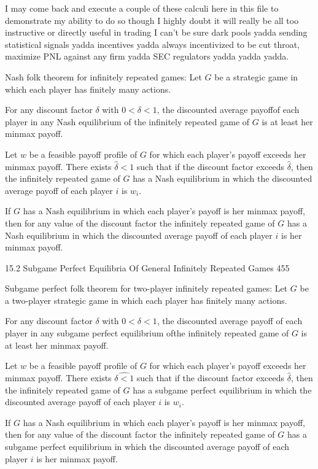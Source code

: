 I may come back and execute a couple of these calculi here in this file to demonstrate my ability to do so though I highly doubt it will really be all too instructive or directly useful in trading I can't be sure dark pools yadda sending statistical signals yadda incentives yadda always incentivized to be cut throat, maximize PNL against any firm yadda SEC regulators yadda yadda yadda.

Nash folk theorem for infinitely repeated games: Let $G$ be a strategic game in which each player has finitely many actions.

For any discount factor $\delta$ with $0<\delta<1$, the discounted average payoffof each player in any Nash equilibrium of the infinitely repeated game of $G$ is at least her minmax payoff.

Let $w$ be a feasible payoff profile of $G$ for which each player's payoff exceeds her minmax payoff. There exists $\hat{\delta}<1$ such that if the discount factor exceeds $\hat{\delta}$, then the infinitely repeated game of $G$ has a Nash equilibrium in which the discounted average payoff of each player $i$ is $w_i$.

If $G$ has a Nash equilibrium in which each player's payoff is her minmax payoff, then for any value of the discount factor the infinitely repeated game of $G$ has a Nash equilibrium in which the discounted average payoff of each player $i$ is her minmax payoff.

15.2 Subgame Perfect Equilibria Of General Infinitely Repeated Games 455

Subgame perfect folk theorem for two-player infinitely repeated games: Let $G$ be a two-player strategic game in which each player has finitely many actions.

For any discount factor $\delta$ with $0<\delta<1$, the discounted average payoff of each player in any subgame perfect equilibrium ofthe infinitely repeated game of $G$ is at least her minmax payoff.

Let $w$ be a feasible payoff profile of $G$ for which each player's payoff exceeds her minmax payoff. There exists $\hat{\delta<1}$ such that if the discount factor exceeds $\hat{\delta}$, then the infinitely repeated game of $G$ has a subgame perfect equilibrium in which the discounted average payoff of each player $i$ is $w_i$.

If $G$ has a Nash equilibrium in which each player's payoff is her minmax payoff, then for any value of the discount factor the infinitely repeated game of $G$ has a subgame perfect equilibrium in which the discounted average payoff of each player $i$ is her minmax payoff.


